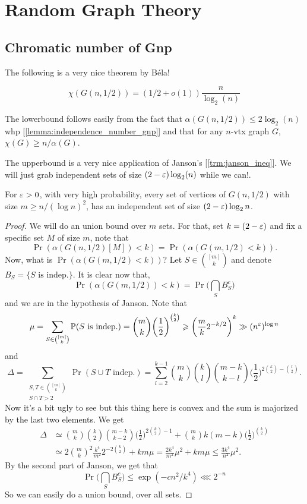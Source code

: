 \section{Random Graph Theory}

\subsection{Chromatic number of Gnp}
The following is a very nice theorem by Béla!
\begin{theorem} [Béla 87]
	\label{trm:chromatic_gnhalf}
	\begin{equation}
		\chi(G(n,1/2)) = (1/2 + o(1))\frac{n}{\log_2(n)}
	\end{equation}
\end{theorem}
The lowerbound follows easily from the fact that $\alpha(G(n,1/2))
\leq 2\log_2(n)$ whp [\ref{lemma:independence_number_gnp}] and that
for any $n$-vtx graph $G$, $\chi(G) \geq n/\alpha(G)$.

The upperbound is a very nice application of Janson's
[\ref{trm:janson_ineq}]. We will just grab independent
sets of size $(2 - \varepsilon)\log_2(n)$ while we can!.

\begin{lemma}
	For $\varepsilon > 0$, with very high probability, every  set of vertices
	of $G(n,1/2)$ with size $m \geq n/(\log n)^2$,
	has an independent set of size $(2 - \varepsilon)\log_2{n}$.
\end{lemma}
\begin{proof}
	We will do an union bound over $m$ sets. For that, set $k =
	(2-\varepsilon)$ and fix a specific set $M$ of size $m$, note that
	\[
		\Pr(\alpha(G(n,1/2)[M]) < k) = \Pr(\alpha(G(m,1/2) < k)).
	\]
	Now, what is $\Pr(\alpha(G(m,1/2) < k))$? Let $S \in \binom{[m]}{k}$
	and denote $B_S = \{S \text{ is indep.}\}$.
	It is clear now that,
	\[
		\Pr(\alpha(G(m,1/2)) < k) = \Pr\bigg(\bigcap_S B_S^c\bigg)
	\]
	and we are in the hypothesis of Janson. Note that
	\[
		\mu = \sum_{S \in \binom{[m]}{k}} \mathbb{P}(S \text{ is indep.}) =
		\binom{m}{k}\bigg(\frac{1}{2}\bigg)^{\binom{k}{2}}
		\geqslant \bigg(\frac{m}{k}2^{-{k}/2}\bigg)^k \gg (n^{\varepsilon})^{\log n}
	\]
	and
	\[
		\Delta = \sum_{\substack{S,T \in \binom{[m]}{k}\\S \cap T > 2}}
		\Pr(S\cup T \text{ indep.})
		= \sum_{l = 2}^{k-1}\binom{m}{k}\binom{k}{l}\binom{m - k}{k -
		l}\bigg(\frac{1}{2}\bigg)^{2\binom{k}{2} - \binom{l}{2}}.
	\]
	Now it's a bit ugly to see but this thing here is convex and the sum
	is majorized by the last two elements. We get
	\begin{align*}
		\Delta & \simeq \binom{m}{k}\binom{k}{2}\binom{m - k}{k -
		2}\bigg(\frac{1}{2}\bigg)^{2\binom{k}{2} - 1} + \binom{m}{k}k (m -
		k)\bigg(\frac{1}{2}\bigg)^{\binom{k}{2}}                                   \\
		& \simeq 2\binom{m}{k}^2 \frac{k^4}{m^2} 2^{-2\binom{k}{2}} + km\mu
		=  \frac{2k^4}{m^2}\mu^2 + km\mu \leq \frac{3k^4}{n^2}\mu^2.
	\end{align*}
	By the second part of Janson, we get that
	\[
		\Pr\bigg(\bigcap_S B_S^c\bigg) \leq \exp(- cn^2/k^4) \lll 2^{-n}
	\]
	So we can easily do a union bound, over all sets.
\end{proof}

